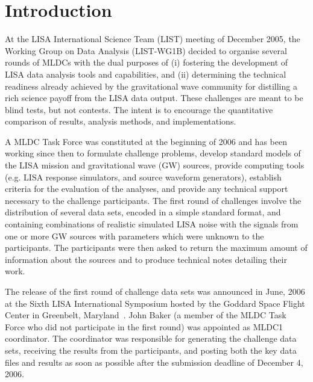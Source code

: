 \documentclass[12pt]{iopart}
\begin{document}

\section{Introduction}

At the LISA International Science Team (LIST) meeting of December 2005, the Working Group on Data Analysis (LIST-WG1B) decided to organise several rounds of MLDCs with the dual purposes of (i) fostering the development of LISA data analysis tools and capabilities, and (ii) determining the technical readiness already achieved by the gravitational wave community for distilling a rich science payoff from the LISA data output. These challenges are meant to be blind tests, but not contests. The intent is to encourage the quantitative comparison of results, analysis methods, and implementations.

A MLDC Task Force was constituted at the beginning of 2006 and has been working since then to formulate challenge problems, develop standard models of the LISA mission and gravitational wave (GW) sources, provide computing tools (e.g. LISA response simulators, and source waveform generators), establish criteria for the evaluation of the analyses, and provide any technical support necessary to the challenge participants. The first round of challenges involve the distribution of several data sets, encoded in a simple standard format, and containing combinations of realistic simulated LISA noise with the signals from one or more GW sources with parameters which were unknown to the participants. The participants were then asked to return the maximum amount of information about the sources and to produce technical notes detailing their work.

The release of the first round of challenge data sets was announced in June, 2006 at the Sixth LISA International Symposium hosted by the Goddard Space Flight Center in Greenbelt, Maryland~\cite{MLDCLISA06a, MLDCLISA06b}. John Baker (a member of the MLDC Task Force who did not participate in the first round) was appointed as MLDC1 coordinator. The coordinator was responsible for generating the challenge data sets, receiving the results from the participants, and posting both the key data files and results as soon as possible after the submission deadline of December 4, 2006.
\end{document}
